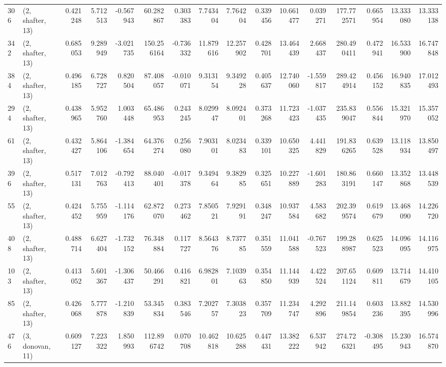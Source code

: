 \begin{tabular}{llrrrrrrrrrrrrrr}
306 &  (2, shafter, 13) &   0.421248 &   5.712513 &  -0.567943 &    60.282867 &   0.303383 &   7.743404 &   7.764204 &  0.339456 &  10.661477 &   0.039271 &   177.772571 &   0.665954 &  13.333080 &  13.333138 \\
342 &  (2, shafter, 13) &   0.685053 &   9.289949 &  -3.021735 &   150.256164 &  -0.736332 &  11.879616 &  12.257902 &  0.428701 &  13.464439 &   2.668437 &   280.490411 &   0.472941 &  16.533900 &  16.747848 \\
384 &  (2, shafter, 13) &   0.496185 &   6.728727 &   0.820504 &    87.408057 &  -0.010071 &   9.313154 &   9.349228 &  0.405637 &  12.740060 &  -1.559817 &   289.424914 &   0.456152 &  16.940835 &  17.012493 \\
294 &  (2, shafter, 13) &   0.438965 &   5.952760 &   1.003448 &    65.486953 &   0.243245 &   8.029947 &   8.092401 &  0.373268 &  11.723423 &  -1.037435 &   235.839047 &   0.556844 &  15.321970 &  15.357052 \\
61  &  (2, shafter, 13) &   0.432427 &   5.864106 &  -1.384654 &    64.376274 &   0.256080 &   7.903101 &   8.023483 &  0.339101 &  10.650325 &   4.441829 &   191.836265 &   0.639528 &  13.118934 &  13.850497 \\
396 &  (2, shafter, 13) &   0.517131 &   7.012763 &  -0.792413 &    88.040401 &  -0.017378 &   9.349464 &   9.382985 &  0.325651 &  10.227889 &  -1.601283 &   180.863191 &   0.660147 &  13.352868 &  13.448539 \\
55  &  (2, shafter, 13) &   0.424452 &   5.755959 &  -1.114176 &    62.872070 &   0.273462 &   7.850521 &   7.929191 &  0.348247 &  10.937584 &   4.583682 &   202.399574 &   0.619679 &  13.468090 &  14.226720 \\
408 &  (2, shafter, 13) &   0.488714 &   6.627404 &  -1.732152 &    76.348884 &   0.117727 &   8.564376 &   8.737785 &  0.351559 &  11.041588 &  -0.767523 &   199.288987 &   0.625523 &  14.096095 &  14.116975 \\
103 &  (2, shafter, 13) &   0.413052 &   5.601367 &  -1.306437 &    50.466291 &   0.416821 &   6.982801 &   7.103963 &  0.354850 &  11.144939 &   4.422524 &   207.651124 &   0.609811 &  13.714679 &  14.410105 \\
85  &  (2, shafter, 13) &   0.426068 &   5.777878 &  -1.210839 &    53.345834 &   0.383546 &   7.202757 &   7.303823 &  0.357709 &  11.234747 &   4.292896 &   211.149854 &   0.603236 &  13.882395 &  14.530996 \\
476 &  (3, donovan, 11) &   0.609127 &   7.223322 &   1.850993 &   112.896742 &   0.070708 &  10.462818 &  10.625288 &  0.447431 &  13.382222 &   6.537942 &   274.726321 &  -0.308495 &  15.230943 &  16.574870 \\

\end{tabular}
